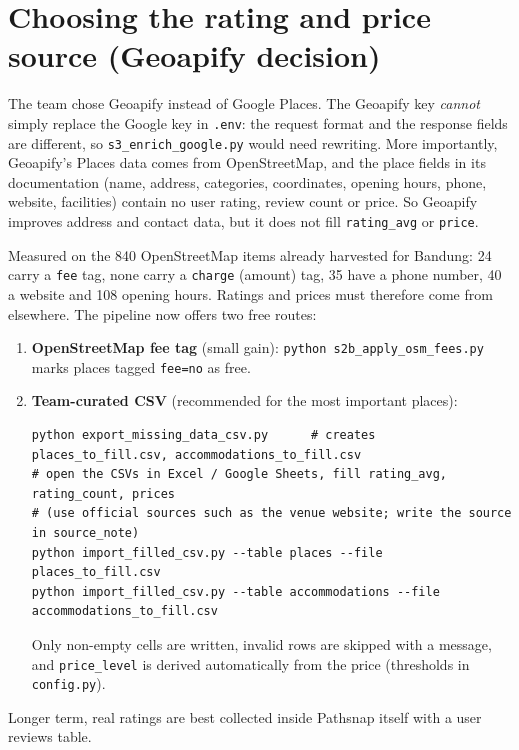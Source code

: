 \documentclass[11pt,a4paper]{article}
\begin{document}
\section{Choosing the rating and price source (Geoapify decision)}
The team chose Geoapify instead of Google Places. The Geoapify key \emph{cannot} simply replace the Google key in \texttt{.env}: the request format and the response fields are different, so \texttt{s3\_enrich\_google.py} would need rewriting. More importantly, Geoapify's Places data comes from OpenStreetMap, and the place fields in its documentation (name, address, categories, coordinates, opening hours, phone, website, facilities) contain no user rating, review count or price. So Geoapify improves address and contact data, but it does not fill \texttt{rating\_avg} or \texttt{price}.

Measured on the 840 OpenStreetMap items already harvested for Bandung: 24 carry a \texttt{fee} tag, none carry a \texttt{charge} (amount) tag, 35 have a phone number, 40 a website and 108 opening hours. Ratings and prices must therefore come from elsewhere. The pipeline now offers two free routes:

\begin{enumerate}[leftmargin=*]
\item \textbf{OpenStreetMap fee tag} (small gain): \texttt{python s2b\_apply\_osm\_fees.py} marks places tagged \texttt{fee=no} as free.
\item \textbf{Team-curated CSV} (recommended for the most important places):
\begin{lstlisting}
python export_missing_data_csv.py      # creates places_to_fill.csv, accommodations_to_fill.csv
# open the CSVs in Excel / Google Sheets, fill rating_avg, rating_count, prices
# (use official sources such as the venue website; write the source in source_note)
python import_filled_csv.py --table places --file places_to_fill.csv
python import_filled_csv.py --table accommodations --file accommodations_to_fill.csv
\end{lstlisting}
Only non-empty cells are written, invalid rows are skipped with a message, and \texttt{price\_level} is derived automatically from the price (thresholds in \texttt{config.py}).
\end{enumerate}
Longer term, real ratings are best collected inside Pathsnap itself with a user reviews table.
\end{document}
